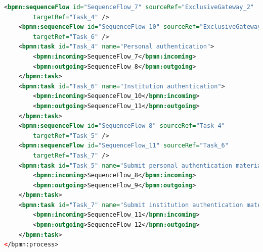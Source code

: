\documentclass[runningheads]{llncs}
\begin{document}
\begin{lstlisting}[language={XML}]
    <bpmn:sequenceFlow id="SequenceFlow_7" sourceRef="ExclusiveGateway_2"
        targetRef="Task_4" />
    <bpmn:sequenceFlow id="SequenceFlow_10" sourceRef="ExclusiveGateway_2"
        targetRef="Task_6" />
    <bpmn:task id="Task_4" name="Personal authentication">
        <bpmn:incoming>SequenceFlow_7</bpmn:incoming>
        <bpmn:outgoing>SequenceFlow_8</bpmn:outgoing>
    </bpmn:task>
    <bpmn:task id="Task_6" name="Institution authentication">
        <bpmn:incoming>SequenceFlow_10</bpmn:incoming>
        <bpmn:outgoing>SequenceFlow_11</bpmn:outgoing>
    </bpmn:task>
    <bpmn:sequenceFlow id="SequenceFlow_8" sourceRef="Task_4"
        targetRef="Task_5" />
    <bpmn:sequenceFlow id="SequenceFlow_11" sourceRef="Task_6"
        targetRef="Task_7" />
    <bpmn:task id="Task_5" name="Submit personal authentication materials">
        <bpmn:incoming>SequenceFlow_8</bpmn:incoming>
        <bpmn:outgoing>SequenceFlow_9</bpmn:outgoing>
    </bpmn:task>
    <bpmn:task id="Task_7" name="Submit institution authentication materials">
        <bpmn:incoming>SequenceFlow_11</bpmn:incoming>
        <bpmn:outgoing>SequenceFlow_12</bpmn:outgoing>
    </bpmn:task>
</bpmn:process>
   \end{lstlisting}
    \clearpage
\end{document}

